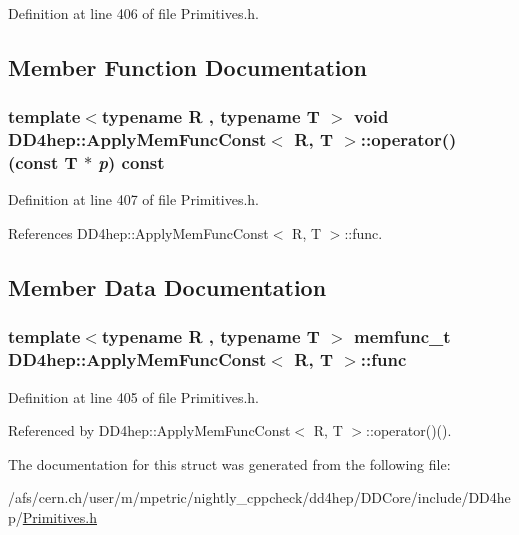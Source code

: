 Definition at line 406 of file Primitives.h.

\subsection{Member Function Documentation}
\hypertarget{struct_d_d4hep_1_1_apply_mem_func_const_a9d8f199e5ea2cbd32aea36848e6707f9}{
\subsubsection[{operator()}]{\setlength{\rightskip}{0pt plus 5cm}template$<$typename R , typename T $>$ void {\bf DD4hep::ApplyMemFuncConst}$<$ R, {\bf T} $>$::operator() (const {\bf T} $\ast$ {\em p}) const}}
\label{struct_d_d4hep_1_1_apply_mem_func_const_a9d8f199e5ea2cbd32aea36848e6707f9}


Definition at line 407 of file Primitives.h.

References DD4hep::ApplyMemFuncConst$<$ R, T $>$::func.

\subsection{Member Data Documentation}
\hypertarget{struct_d_d4hep_1_1_apply_mem_func_const_a667382c86c9164ebeb9ff332d34d082a}{
\subsubsection[{func}]{\setlength{\rightskip}{0pt plus 5cm}template$<$typename R , typename T $>$ {\bf memfunc\_\-t} {\bf DD4hep::ApplyMemFuncConst}$<$ R, {\bf T} $>$::{\bf func}}}
\label{struct_d_d4hep_1_1_apply_mem_func_const_a667382c86c9164ebeb9ff332d34d082a}


Definition at line 405 of file Primitives.h.

Referenced by DD4hep::ApplyMemFuncConst$<$ R, T $>$::operator()().

The documentation for this struct was generated from the following file:\begin{DoxyCompactItemize}
\item 
/afs/cern.ch/user/m/mpetric/nightly\_\-cppcheck/dd4hep/DDCore/include/DD4hep/\hyperlink{_primitives_8h}{Primitives.h}\end{DoxyCompactItemize}
